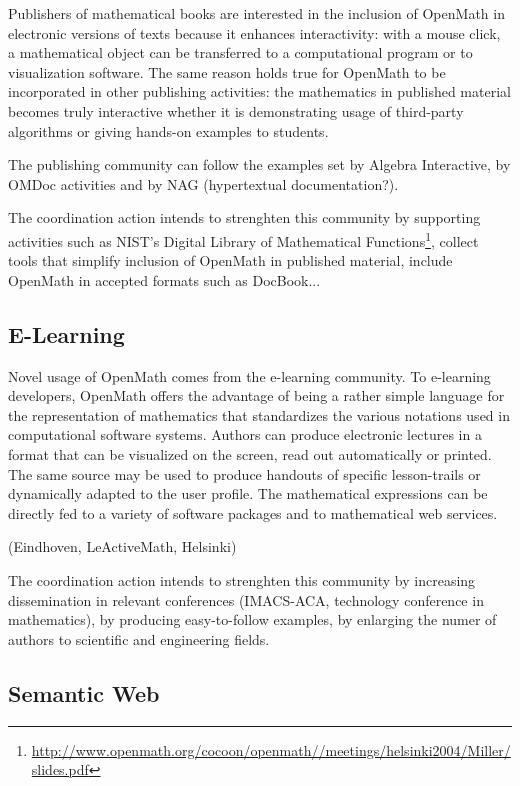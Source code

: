 \documentclass[draft]{artikel3}
\begin{document}
Publishers of mathematical books are interested in the inclusion of
OpenMath in electronic versions of texts because it enhances
interactivity: with a mouse click, a mathematical object can be
transferred to a computational program or to visualization software.
The same reason holds true for OpenMath to be incorporated in other
publishing activities: the mathematics in published material becomes
truly interactive whether it is demonstrating usage of third-party
algorithms or giving hands-on examples to students. 

The publishing community can follow the examples set by Algebra
Interactive, by OMDoc activities and by NAG (hypertextual
documentation?).

The coordination action intends to strenghten this community by
supporting activities such as NIST's Digital Library of Mathematical
Functions\footnote{\url{http://www.openmath.org/cocoon/openmath//meetings/helsinki2004/Miller/slides.pdf}},
collect tools that simplify inclusion of OpenMath in published
material, include OpenMath in accepted formats such as DocBook...


\subsection{E-Learning}
\label{sec:e-learn}
Novel usage of OpenMath comes from the e-learning community. To
e-learning developers, OpenMath offers the advantage of being a rather
simple language for the representation of mathematics that
standardizes the various notations used in computational software
systems. Authors can produce electronic lectures in a format that can
be visualized on the screen, read out automatically or printed. The
same source may be used to produce handouts of specific lesson-trails
or dynamically adapted to the user profile. The mathematical
expressions can be directly fed to a variety of software packages and
to mathematical web services. 

(Eindhoven, LeActiveMath, Helsinki)

The coordination action intends to strenghten this community by
increasing dissemination in relevant conferences (IMACS-ACA,
technology conference in mathematics), by producing easy-to-follow
examples, by enlarging the numer of authors to scientific and
engineering fields.



\subsection{Semantic Web}
\label{sec:semw}
\end{document}
